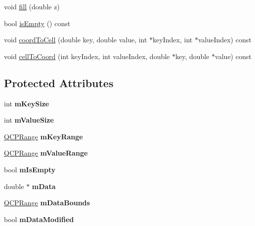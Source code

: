 \begin{DoxyCompactItemize}
\item 
void \hyperlink{class_q_c_p_color_map_data_a350f783260eb9b5de5c7b5e0d5d3e3c2}{fill} (double z)
\item 
bool \hyperlink{class_q_c_p_color_map_data_aea88cc75a76ca571acf29b2ba8ac970d}{is\+Empty} () const
\item 
void \hyperlink{class_q_c_p_color_map_data_aca5b29e0ca2f299c9060fc6e1f74d0c8}{coord\+To\+Cell} (double key, double value, int $\ast$key\+Index, int $\ast$value\+Index) const
\item 
void \hyperlink{class_q_c_p_color_map_data_af1a36385c78ab624cd617065602408b6}{cell\+To\+Coord} (int key\+Index, int value\+Index, double $\ast$key, double $\ast$value) const
\end{DoxyCompactItemize}
\subsection*{Protected Attributes}
\begin{DoxyCompactItemize}
\item 
\mbox{\label{class_q_c_p_color_map_data_a354e06462023340fbc03894b22499f6d}} 
int {\bfseries m\+Key\+Size}
\item 
\mbox{\label{class_q_c_p_color_map_data_ae8ee9093632a59f55eb4fc06579ed256}} 
int {\bfseries m\+Value\+Size}
\item 
\mbox{\label{class_q_c_p_color_map_data_aaaafd0d7d0f153dbd152f3daf34254ee}} 
\hyperlink{class_q_c_p_range}{Q\+C\+P\+Range} {\bfseries m\+Key\+Range}
\item 
\mbox{\label{class_q_c_p_color_map_data_a225bb96f10c1a27b51ae59249477dbef}} 
\hyperlink{class_q_c_p_range}{Q\+C\+P\+Range} {\bfseries m\+Value\+Range}
\item 
\mbox{\label{class_q_c_p_color_map_data_a10e91aa89ed05bd177b1f81e07b465b8}} 
bool {\bfseries m\+Is\+Empty}
\item 
\mbox{\label{class_q_c_p_color_map_data_ac1682862022f575191351c9825187d39}} 
double $\ast$ {\bfseries m\+Data}
\item 
\mbox{\label{class_q_c_p_color_map_data_a1798b3dcc0a27091d196bfd156dcb3f2}} 
\hyperlink{class_q_c_p_range}{Q\+C\+P\+Range} {\bfseries m\+Data\+Bounds}
\item 
\mbox{\label{class_q_c_p_color_map_data_ad3cc682da2ac14e5acdbc05cf4d3d93b}} 
bool {\bfseries m\+Data\+Modified}
\end{DoxyCompactItemize}

